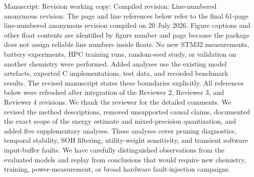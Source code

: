 \markdownRendererDocumentBegin
\markdownRendererSectionBegin
{}\markdownRendererInterblockSeparator
{}Manuscript: \markdownRendererParagraphSeparator
{}Revision working copy: \markdownRendererParagraphSeparator
{}Compiled revision: \markdownRendererParagraphSeparator
{}Line-numbered anonymous revision: \markdownRendererParagraphSeparator
{}The page and line references below refer to the final 61-page line-numbered anonymous revision compiled on 20 July 2026. Figure captions and other float contents are identified by figure number and page because the  package does not assign reliable line numbers inside floats. No new STM32 measurements, battery experiments, HPC training runs, random-seed study, or validation on another chemistry were performed. Added analyses use the existing model artefacts, exported C implementations, test data, and recorded benchmark results. The revised manuscript states these boundaries explicitly. All references below were refreshed after integration of the Reviewer 2, Reviewer 3, and Reviewer 4 revisions.\markdownRendererInterblockSeparator
{}\markdownRendererSectionBegin
{}\markdownRendererInterblockSeparator
{}We thank the reviewer for the detailed comments. We revised the method descriptions, removed unsupported causal claims, documented the exact scope of the energy estimate and mixed-precision quantization, and added five supplementary analyses. These analyses cover pruning diagnostics, temporal stability, SOH filtering, utility-weight sensitivity, and transient software input-buffer faults. We have carefully distinguished observations from the evaluated models and replay from conclusions that would require new chemistry, training, power-measurement, or broad hardware fault-injection campaigns.\markdownRendererInterblockSeparator
{}
\markdownRendererSectionEnd \markdownRendererSectionBegin
